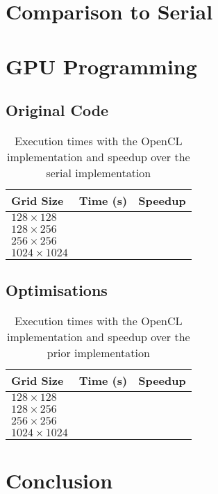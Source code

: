 \documentclass[twocolumn, a4paper]{article}
\begin{document}
\section{Comparison to Serial}

\section{GPU Programming}

\subsection{Original Code}

\begin{table}[htbp]
  \begin{center}
  \caption{Execution times with the OpenCL implementation and speedup over the serial implementation}\label{tab:OpenCL_1}
  \begin{tabular}[t]{l | l l} 
      \hline\hline
      Grid Size&Time (s)&Speedup\\
      \hline
      $128 \times 128$&\texttt{}&\texttt{}\\
      $128 \times 256$&\texttt{}&\texttt{}\\
      $256 \times 256$&\texttt{}&\texttt{}\\
      $1024 \times 1024$&\texttt{}&\texttt{}\\
      \hline
    \end{tabular}
  \end{center}
\end{table}

\subsection{Optimisations}

\begin{table}[htbp]
  \begin{center}
  \caption{Execution times with the OpenCL implementation and speedup over the prior implementation}\label{tab:OpenCL_2}
  \begin{tabular}[t]{l | l l} 
      \hline\hline
      Grid Size&Time (s)&Speedup\\
      \hline
      $128 \times 128$&\texttt{}&\texttt{}\\
      $128 \times 256$&\texttt{}&\texttt{}\\
      $256 \times 256$&\texttt{}&\texttt{}\\
      $1024 \times 1024$&\texttt{}&\texttt{}\\
      \hline
    \end{tabular}
  \end{center}
\end{table}

\section{Conclusion}

\printbibliography
\end{document}
